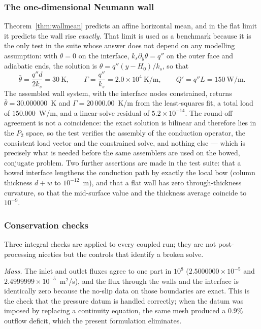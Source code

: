 \documentclass[11pt,a4paper]{article}
\begin{document}
\subsubsection{The one-dimensional Neumann wall}
\label{sec:neumann}

Theorem~\ref{thm:wallmean} predicts an affine horizontal mean, and in the flat limit it
predicts the wall rise \emph{exactly}. That limit is used as a benchmark because it is the only
test in the suite whose answer does not depend on any modelling assumption: with
$\theta=0$ on the interface, $k_s\partial_y\theta=q''$ on the outer face and adiabatic ends,
the solution is $\theta=q''(y-H_0)/k_s$, so that
\begin{equation}
\bar\theta=\frac{q''d}{2k_s}=30\ \mathrm{K},\qquad
\Gamma=\frac{q''}{k_s}=2.0\times10^{4}\ \mathrm{K/m},\qquad
Q'=q''L=150\ \mathrm{W/m}.
\label{eq:neumann}
\end{equation}
The assembled wall system, with the interface nodes constrained, returns
$\bar\theta=30.000000$~K and $\Gamma=20\,000.00$~K/m from the least-squares fit, a total load
of $150.000$~W/m, and a linear-solve residual of $5.2\times10^{-14}$. The round-off agreement is
not a coincidence: the exact solution is bilinear and therefore lies in the $P_2$ space, so the
test verifies the assembly of the conduction operator, the consistent load vector and the
constrained solve, and nothing else --- which is precisely what is needed before the same
assemblers are used on the bowed, conjugate problem. Two further assertions are made in the
test suite: that a bowed interface lengthens the conduction path by exactly the local bow
(column thickness $d+w$ to $10^{-12}$~m), and that a flat wall has zero through-thickness
curvature, so that the mid-surface value and the thickness average coincide to $10^{-9}$.

\subsubsection{Conservation checks}
\label{sec:conservation}

Three integral checks are applied to every coupled run; they are not
post-processing niceties but the controls that identify a broken solve.

\emph{Mass.} The inlet and outlet fluxes agree to one part in $10^{8}$
($2.5000000\times10^{-5}$ and $2.4999999\times10^{-5}$~m$^2$/s), and the flux
through the walls and the interface is identically zero because the no-slip
data on those boundaries are exact. This is the check that the pressure datum
is handled correctly; when the datum was imposed by replacing a continuity
equation, the same mesh produced a $0.9\%$ outflow deficit, which the present
formulation eliminates.
\end{document}
